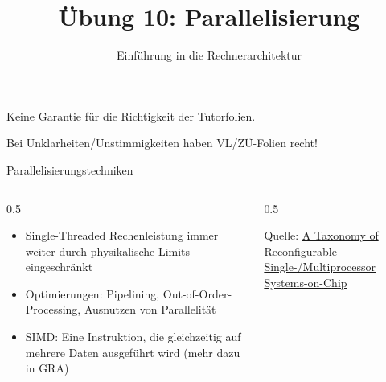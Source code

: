 

\title{Übung 10: Parallelisierung}
\subtitle{Einführung in die Rechnerarchitektur}
\date{}



\maketitle

\begin{frame}[c, fragile]{}{}
	\begin{center}
		\LARGE  Keine Garantie für die Richtigkeit der Tutorfolien.

		\Large Bei Unklarheiten/Unstimmigkeiten haben VL/ZÜ-Folien recht!
	\end{center}
\end{frame}

\begin{frame}[c, fragile]{Parallelisierungstechniken}{}
	\begin{columns}[c]
		\begin{column}{0.5\textwidth}
			\begin{itemize}
				\item Single-Threaded Rechenleistung immer weiter durch physikalische Limits eingeschränkt
				\item Optimierungen: Pipelining, Out-of-Order-Processing, Ausnutzen von Parallelität
				\item SIMD: Eine Instruktion, die gleichzeitig auf mehrere Daten ausgeführt wird (mehr dazu in GRA)

			\end{itemize}
		\end{column}
		\begin{column}{0.5\textwidth}
			\begin{center}
			\end{center}
			\centering
			\tiny{Quelle: \href{https://www.researchgate.net/publication/26639095_A_Taxonomy_of_Reconfigurable_Single-Multiprocessor_Systems-on-Chip}{A Taxonomy of Reconfigurable Single-/Multiprocessor\\Systems-on-Chip}}
		\end{column}
	\end{columns}
\end{frame}

